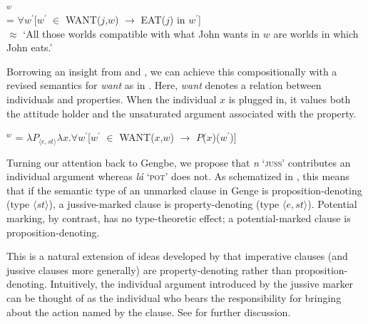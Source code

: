 \documentclass[output=paper,modfonts,nonflat]{langsci/langscibook}
\begin{document}
\ea 
{}$^{w}$\\  = $\forall w^{\prime}$[$w^{\prime}$ $\in$ WANT($j$,$w$) $\rightarrow$ EAT($j$) in $w^{\prime}$]\\
$\approx$ `All those worlds compatible with what John wants in $w$ are worlds in which John eats.' \label{ex:grano:wcs:24}
\z

Borrowing an insight from \citet{Chierchi1984} and \citet{Dowty1985}, we can achieve this compositionally with a revised semantics for \emph{want} as in . Here, \emph{want} denotes a relation between individuals and properties. When the individual $x$ is plugged in, it values both the attitude holder and the unsaturated argument associated with the property.

\ea
{}$^{w}$ = $\lambda P_{\langle  e, st\rangle}\lambda x.\forall w^{\prime}$[$w^{\prime}$ $\in$ WANT($x$,$w$) $\rightarrow$ $P$($x$)($w^{\prime}$)] \label{ex:grano:w2:25}
\z

Turning our attention back to Gengbe, we propose that \emph{n{\É}} `\textsc{juss}' contributes an individual argument whereas \emph{l\'a} `\textsc{pot}' does not. As schematized in , this means that if the semantic type of an unmarked clause in Genge is proposition-denoting (type $\langle st\rangle$), a jussive-marked clause is property-denoting (type $\langle e,st\rangle$). Potential marking, by contrast, has no type-theoretic effect; a potential-marked clause is proposition-denoting. 


\ea \label{ex:grano:mm:26}
    \begin{xlist}
    \end{xlist}
\z

This is a natural extension of ideas developed by \cite{Portner2004, Portner2007, Zanuttini2012} that imperative clauses (and jussive clauses more generally) are property-denoting rather than proposition-denoting. Intuitively, the individual argument introduced by the jussive marker can be thought of as the individual who bears the responsibility for bringing about the action named by the clause.  See \citealt{GranoToappear} for further discussion.


\end{document}
